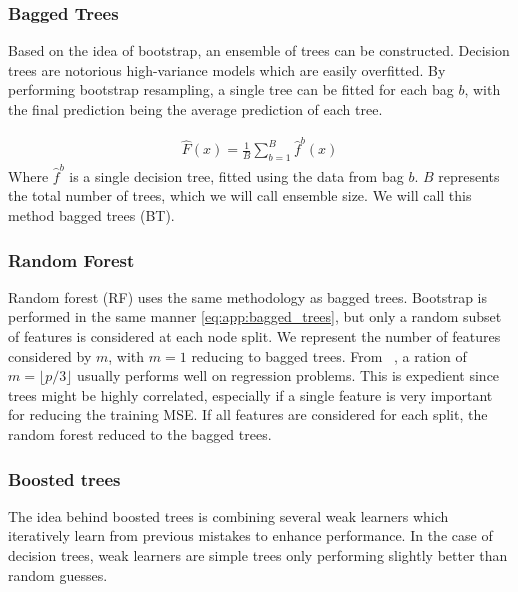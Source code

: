             \subsubsection{Bagged Trees}
                Based on the idea of bootstrap, an ensemble of trees can be constructed. Decision trees are notorious high-variance models which are easily overfitted. By performing bootstrap resampling, a single tree can be fitted for each bag $b$, with the final prediction being the average prediction of each tree.

                \begin{align}
                    \hat{F}(x) = \frac{1}{B}\sum_{b = 1}^{B} \hat{f}^b (x) \label{eq:app:bagged_trees}
                \end{align}
                Where $\hat{f}^b$ is a single decision tree, fitted using the data from bag $b$. $B$ represents the total number of trees, which we will call ensemble size. We will call this method bagged trees (BT).

            \subsubsection{Random Forest}
                Random forest (RF) uses the same methodology as bagged trees. Bootstrap is performed in the same manner \cref{eq:app:bagged_trees}, but only a random subset of features is considered at each node split. We represent the number of features considered by $m$, with $m = 1$ reducing to bagged trees. From ~\citep{hastie01statisticallearning}, a ration of $m = \lfloor p/3 \rfloor$ usually performs well on regression problems. This is expedient since trees might be highly correlated, especially if a single feature is very important for reducing the training MSE. If all features are considered for each split, the random forest reduced to the bagged trees.
            
            \subsubsection{Boosted trees}
                The idea behind boosted trees is combining several weak learners which iteratively learn from previous mistakes to enhance performance. In the case of decision trees, weak learners are simple trees only performing slightly better than random guesses. 

